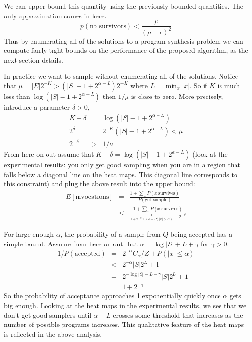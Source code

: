 \documentclass{article}
\begin{document}
We can upper bound this quantity using the previously bounded quantities.
The only approximation comes in here:
\begin{equation}
  p(\text{no survivors}) < \frac{\mu}{(\mu - \epsilon)^2}
\end{equation}
Thus by enumerating all of the solutions to a program synthesis problem we can compute fairly tight bounds on the performance of the proposed algorithm,
as the next section details.

In practice we want to sample without enumerating all of the solutions.
Notice that $\mu = |E|2^{-K} > (|S| - 1 + 2^{\alpha - L})2^{-K}$ where $L = \min_x |x|$.
So if $K$ is much less than $\log (|S| - 1 + 2^{\alpha - L})$ then $1/\mu$ is close to zero.
More precisely,
introduce a parameter $\delta > 0$,
\begin{eqnarray}
  K + \delta& = &\log (|S| - 1 + 2^{\alpha - L})\\
  2^\delta& = &2^{-K}  (|S| - 1 + 2^{\alpha - L}) < \mu\\
  2^{-\delta}& > &1/\mu
\end{eqnarray}
From here on out assume that $K + \delta = \log (|S| - 1 + 2^{\alpha - L})$ (look at the experimental results: you only get good sampling when you are in a region that falls below a diagonal line on the heat maps. This diagonal line corresponds to this constraint)
and plug the above result into the upper bound:
\begin{eqnarray}
  E[\text{invocations}]& =&   \frac{1 + \sum_x P(x \text{ survives})}{P(\text{get sample})}\\
  &<& \frac{1 + \sum_x P(x \text{ survives})}{\frac{1}{1 + 2^{-\alpha}C_\alpha/Z - P(|x|>\alpha)} - 2^{-\delta}}
\end{eqnarray}

For large enough $\alpha$, the probability of a sample from $Q$ being accepted has a simple bound.
Assume from here on out that $\alpha = \log |S| + L + \gamma$ for $\gamma > 0$:
\begin{eqnarray}
  1/P(\text{accepted}) &= &2^{-\alpha}C_\alpha/Z + P(|x|\leq \alpha)\\
  &  < &2^{-\alpha}|S|2^L + 1\\
  & = &2^{-\log |S|-L - \gamma}|S|2^L + 1\\
  & = &1 + 2^{ - \gamma}
\end{eqnarray}
So the probability of acceptance approaches 1 exponentially quickly once $\alpha$ gets big enough.
Looking at the heat maps in the experimental results,
we see that we don't get good samplers until $\alpha - L$ crosses some threshold that increases as the number of possible programs increases.
This qualitative feature of the heat maps is reflected in the above analysis.
\end{document}
